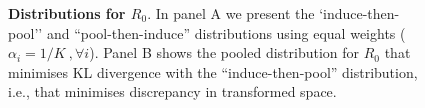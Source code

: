 \documentclass[11pt]{article}
\begin{document}
\begin{figure}
\hfill
\caption{\textbf{Distributions for $R_0$}.
In panel A we present the `induce-then-pool'' and ``pool-then-induce'' distributions using equal weights ($\alpha_i = 1/K \:, \forall i$).
Panel B shows the pooled distribution for $R_0$ that minimises KL divergence with the ``induce-then-pool'' distribution, i.e., that minimises discrepancy in transformed space.
}
\label{fig:abstractFigure}
\end{figure}
\end{document}
